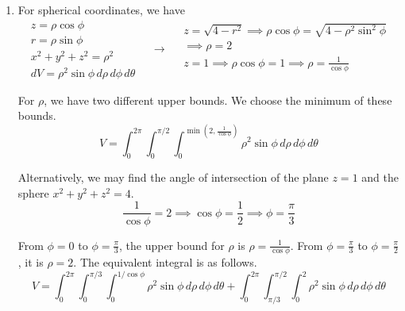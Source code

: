 \documentclass[a4paper, 12pt]{article}
\begin{document}
\begin{enumerate}[leftmargin=*,label=\textbf{\arabic*.}]
\begin{enumerate}[leftmargin=*,label=\textbf{\alph*.}]
Another method is to calculate the volume of the corresponding hemisphere and then extract the upper part of the hemisphere. The volume of a hemisphere is given by the formula
\[V_{\text{hemisphere}}=\frac23\pi r^3,\]

where $r$ is the radius. Now, focus on the upper part of the hemisphere. The upper bound for $z$ is the sphere $x^2+y^2+z^2=4$, and the lower bound is $z=1$. The solid lies above $x^2+y^2=3$. The equivalent form of the answer above is as follows.
\[\boxed{V=\frac{16\pi}3-\int_{-\sqrt3}^{\sqrt3}\int_{-\sqrt{3-x^2}}^{\sqrt{3-x^2}}\int_1^{\sqrt{4-x^2-y^2}}\,dz\,dy\,dx}\]

\item For spherical coordinates, we have
\[
\begin{array}{c}
z=\rho\cos\phi\\
r=\rho\sin\phi\\
x^2+y^2+z^2=\rho^2\\
dV=\rho^2\sin\phi\,d\rho\,d\phi\,d\theta
\end{array}\quad\rightarrow\quad
\begin{array}{c}
z=\sqrt{4-r^2}\implies\rho\cos\phi=\sqrt{4-\rho^2\sin^2\phi}\\\implies\rho=2\\
\displaystyle z=1\implies\rho\cos\phi=1\implies\rho=\frac1{\cos\phi}\\[1em]
\end{array}
\]

For $\rho$, we have two different upper bounds. We choose the minimum of these bounds.
\[\boxed{V=\int_0^{2\pi}\int_{0}^{\pi/2}\int_0^{\min\left(2,\textstyle\frac1{\cos\phi}\right)}\rho^2\sin\phi\,d\rho\,d\phi\,d\theta}\]

Alternatively, we may find the angle of intersection of the plane $z=1$ and the sphere $x^2+y^2+z^2=4$.
\[\frac1{\cos\phi}=2\implies\cos\phi=\frac12\implies\phi=\frac\pi3\]

From $\phi=0$ to $\phi=\frac\pi3$, the upper bound for $\rho$ is $\rho=\frac1{\cos\phi}$. From $\phi=\frac\pi3$ to $\phi=\frac\pi2$, it is $\rho=2$. The equivalent integral is as follows.
\[\boxed{V=\int_0^{2\pi}\int_0^{\pi/3}\int_0^{1/\cos\phi}\rho^2\sin\phi\,d\rho\,d\phi\,d\theta+\int_0^{2\pi}\int_{\pi/3}^{\pi/2}\int_0^2\rho^2\sin\phi\,d\rho\,d\phi\,d\theta}\]

\end{enumerate}


\end{enumerate}
\end{document}
